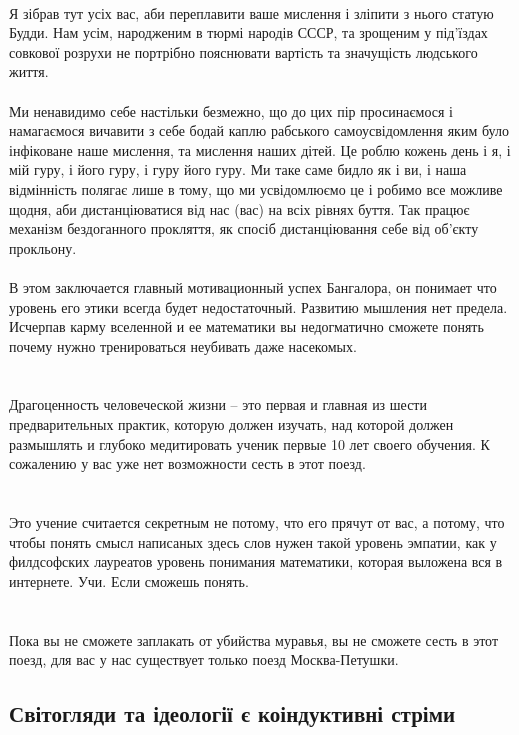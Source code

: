 \\
Я зібрав тут усіх вас, аби переплавити ваше мислення і зліпити з нього статую Будди. Нам усім, народженим
в тюрмі народів СССР, та зрощеним у під'їздах совкової розрухи не портрібно пояснювати вартість
та значущість людського життя.
\\
\\
Ми ненавидимо себе настільки безмежно, що до цих пір просинаємося і намагаємося вичавити з себе
бодай каплю рабського самоусвідомлення яким було інфіковане наше мислення, та мислення наших дітей.
Це роблю кожень день і я, і мій гуру, і його гуру, і гуру його гуру. Ми таке саме бидло як і ви,
і наша відмінність полягає лише в тому, що ми усвідомлюємо це і робимо все можливе щодня, аби
дистанціюватися від нас (вас) на всіх рівнях буття. Так працює механізм бездоганного прокляття, як
спосіб дистанціювання себе від об'єкту прокльону.
\\
\\
В этом заключается главный мотивационный успех Бангалора, он понимает что уровень его этики
всегда будет недостаточный. Развитию мышления нет предела. Исчерпав карму вселенной и ее
математики вы недогматично сможете понять почему нужно тренироваться неубивать даже насекомых.\\
\\
\\
Драгоценность человеческой жизни -- это первая и главная из шести предварительных практик,
которую должен изучать, над которой должен размышлять и глубоко медитировать ученик первые
10 лет своего обучения. К сожалению у вас уже нет возможности сесть в этот поезд.\\
\\
\\
Это учение считается секретным не потому, что его прячут от вас, а потому, что чтобы понять
смысл написаных здесь слов нужен такой уровень эмпатии, как у филдсофских лауреатов уровень
понимания математики, которая выложена вся в интернете. Учи. Если сможешь понять.\\
\\
\\
Пока вы не сможете заплакать от убийства муравья, вы не сможете сесть в этот поезд, для
вас у нас существует только поезд Москва-Петушки.\\

\subsection{Світогляди та ідеології є коіндуктивні стріми}

